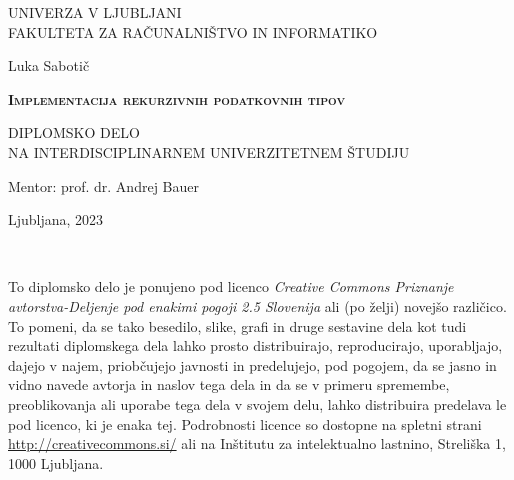 \documentclass[12pt,a4paper,openany]{book}
\begin{document}
\thispagestyle{empty} 

\begin{center}
{\large 
UNIVERZA V LJUBLJANI\\
FAKULTETA ZA RAČUNALNIŠTVO IN INFORMATIKO\\
}

\vspace{3cm}
{\LARGE Luka Sabotič}\\

\vspace{2cm}
{\LARGE
\textsc{\textbf{Implementacija rekurzivnih podatkovnih tipov}}\par}

\vspace{2cm}
{ DIPLOMSKO DELO}\\
{ NA INTERDISCIPLINARNEM UNIVERZITETNEM ŠTUDIJU\\
}

\vspace{2cm} 
{\Large Mentor: prof. dr. Andrej Bauer}

\vfill
{\Large Ljubljana, 2023}
\end{center}

\newpage

\ \thispagestyle{empty}

\newpage


\thispagestyle{empty}

\vspace*{5cm}
{\small \noindent
To diplomsko delo je ponujeno pod licenco \textit{Creative Commons Priznanje avtorstva-Deljenje pod enakimi pogoji 2.5 Slovenija}
ali (po želji) novejšo različico.
To pomeni, da se tako besedilo, slike, grafi in druge sestavine dela kot tudi rezultati diplomskega dela lahko prosto distribuirajo,
reproducirajo, uporabljajo, dajejo v najem, priobčujejo javnosti in predelujejo, pod pogojem, da se jasno in vidno navede avtorja in naslov tega
dela in da se v primeru spremembe, preoblikovanja ali uporabe tega dela v svojem delu, lahko distribuira predelava le pod
licenco, ki je enaka tej.
Podrobnosti licence so dostopne na spletni strani \url{http://creativecommons.si/} ali na Inštitutu za
intelektualno lastnino, Streliška 1, 1000 Ljubljana.

\begin{center}%
  \hspace*{1ex}
\end{center}
}
\end{document}
